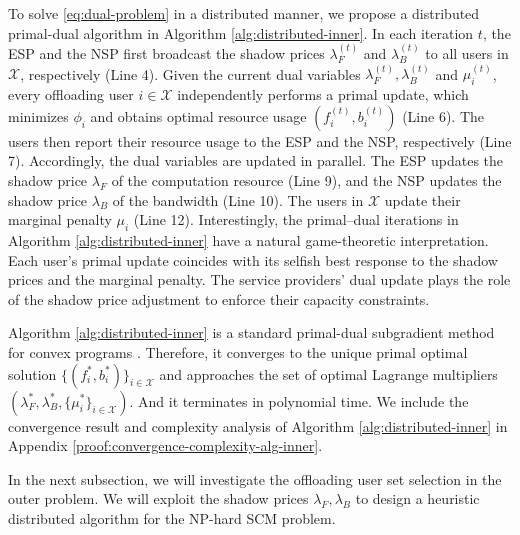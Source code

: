 \documentclass[lettersize,journal]{IEEEtran}
\begin{document}
To solve \eqref{eq:dual-problem} in a distributed manner, we propose a distributed primal-dual algorithm in Algorithm \ref{alg:distributed-inner}. In each iteration $t$, the ESP and the NSP first broadcast the shadow prices $\lambda_F^{(t)}$ and $\lambda_B^{(t)}$ to all users in $\mathcal{X}$, respectively (Line 4). Given the current dual variables $\lambda_F^{(t)},\lambda_B^{(t)}$ and $\mu_i^{(t)}$, every offloading user $i\in \mathcal{X}$ independently performs a primal update, which minimizes $\phi_i$ and obtains optimal resource usage $(f_i^{(t)},b_i^{(t)})$ (Line 6). The users then report their resource usage to the ESP and the NSP, respectively (Line 7). Accordingly, the dual variables are updated in parallel. The ESP updates the shadow price $\lambda_F$ of the computation resource (Line 9), and the NSP updates the shadow price $\lambda_B$ of the bandwidth (Line 10). The users in $\mathcal{X}$ update their marginal penalty $\mu_i$ (Line 12). 
Interestingly, the primal–dual iterations in Algorithm \ref{alg:distributed-inner} have a natural game-theoretic interpretation.
Each user’s primal update coincides with its selfish best response to the shadow prices and the marginal penalty. The service providers’ dual update plays the role of the shadow price adjustment to enforce their capacity constraints.

Algorithm \ref{alg:distributed-inner} is a standard primal-dual subgradient method for convex programs \cite{boyd2004convex,palomar2006tutorial,nedic2009subgradient}. Therefore, it converges to the unique primal optimal solution $\{(f_i^*,b_i^*)\}_{i\in\mathcal{X}}$ and approaches the set of optimal Lagrange multipliers
$(\lambda_F^*,\lambda_B^*,\{\mu_i^*\}_{i\in\mathcal{X}})$. And it terminates in polynomial time. We include the convergence result and complexity analysis of Algorithm \ref{alg:distributed-inner} in Appendix \ref{proof:convergence-complexity-alg-inner}.

In the next subsection, we will investigate the offloading user set selection in the outer problem. We will exploit the shadow prices $\lambda_F,\lambda_B$ to design a heuristic distributed algorithm for the NP-hard SCM problem.
\end{document}
